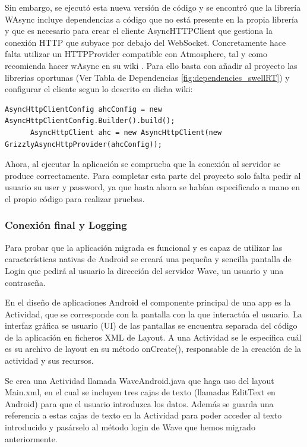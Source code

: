	Sin embargo, se ejecutó esta nueva versión de código y se encontró que la librería WAsync incluye dependencias a código que no está presente en la propia librería y que es necesario para crear el cliente AsyncHTTPClient que gestiona la conexión HTTP que subyace por debajo del WebSocket. Concretamente hace falta utilizar un HTTPProvider compatible con Atmosphere, tal y como recomienda hacer wAsync en su wiki \cite{ref:httpProvider_wAsync}. Para ello basta con añadir al proyecto las librerias oportunas (Ver Tabla de Dependencias \ref{fig:dependencies_swellRT}) y configurar el cliente segun lo descrito en dicha wiki:
		
	  \begin{lstlisting}[frame=single]	
	  AsyncHttpClientConfig ahcConfig = new AsyncHttpClientConfig.Builder().build();
	  AsyncHttpClient ahc = new AsyncHttpClient(new GrizzlyAsyncHttpProvider(ahcConfig));
	  \end{lstlisting}
      
      Ahora, al ejecutar la aplicación se comprueba que la conexión al servidor se produce correctamente. Para completar esta parte del proyecto solo falta pedir al usuario su user y password, ya que hasta ahora se habían especificado a mano en el propio código para realizar pruebas.
	    
    		\subsubsection{Conexión final y Logging}\label{sssec:conFinAndLogin}
    
    Para probar que la aplicación migrada es funcional y es capaz de utilizar las características nativas de Android se creará una pequeña y sencilla pantalla de Login que pedirá al usuario la dirección del servidor Wave, un usuario y una contraseña.
    
    En el diseño de aplicaciones Android el componente principal de una app es la Actividad, que se corresponde con la pantalla con la que interactúa el usuario. La interfaz gráfica se usuario (UI) de las pantallas se encuentra separada del código de la aplicación en ficheros XML de Layout\cite{ref:android_layout}. A una Actividad se le especifica cuál es su archivo de layout en su método onCreate(), responsable de la creación de la actividad y sus recursos. 
    
    Se crea una Actividad llamada WaveAndroid.java que haga uso del layout Main.xml, en el cual se incluyen tres cajas de texto (llamadas EditText en Android) para que el usuario introduzca los datos. Además se guarda una referencia a estas cajas de texto en la Actividad para poder acceder al texto introducido y pasárselo al método login de Wave que hemos migrado anteriormente.
    
